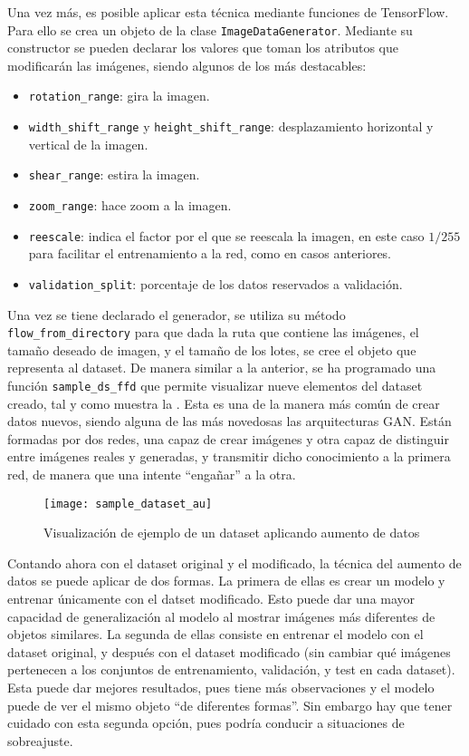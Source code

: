 			Una vez más, es posible aplicar esta técnica mediante funciones de TensorFlow. Para ello se crea un objeto de la clase \texttt{ImageDataGenerator}. Mediante su constructor se pueden declarar los valores que toman los atributos que modificarán las imágenes, siendo algunos de los más destacables: 
			
			\begin{itemize}
				\item \texttt{rotation\_range}: gira la imagen. 
				\item \texttt{width\_shift\_range} y \texttt{height\_shift\_range}: desplazamiento horizontal y vertical de la imagen. 
				\item \texttt{shear\_range}: estira la imagen. 
				\item \texttt{zoom\_range}: hace zoom a la imagen. 
				\item \texttt{reescale}: indica el factor por el que se reescala la imagen, en este caso $1/255$ para facilitar el entrenamiento a la red, como en casos anteriores. 
				\item \texttt{validation\_split}: porcentaje de los datos reservados a validación. 
			\end{itemize}
			
			Una vez se tiene declarado el generador, se utiliza su método \texttt{flow\_from\_directory} para que dada la ruta que contiene las imágenes, el tamaño deseado de imagen, y el tamaño de los lotes, se cree el objeto que representa al dataset. De manera similar a la anterior, se ha programado una función \texttt{sample\_ds\_ffd} que permite visualizar nueve elementos del dataset creado, tal y como muestra la . Esta es una de la manera más común de crear datos nuevos, siendo alguna de las más novedosas las arquitecturas GAN. Están formadas por dos redes, una capaz de crear imágenes y otra capaz de distinguir entre imágenes reales y generadas, y transmitir dicho conocimiento a la primera red, de manera que una intente ``engañar'' a la otra\cite{gan}. \\
			
			\begin{figure}
				\centering
				\texttt{[image: sample\_dataset\_au]}
				\caption{Visualización de ejemplo de un dataset aplicando aumento de datos}
				\label{fig:sample_dataset_au}
			\end{figure}
			
			Contando ahora con el dataset original y el modificado, la técnica del aumento de datos se puede aplicar de dos formas. La primera de ellas es crear un modelo y entrenar únicamente con el datset modificado. Esto puede dar una mayor capacidad de generalización al modelo al mostrar imágenes más diferentes de objetos similares. La segunda de ellas consiste en entrenar el modelo con el dataset original, y después con el dataset modificado (sin cambiar qué imágenes pertenecen a los conjuntos de entrenamiento, validación, y test en cada dataset). Esta puede dar mejores resultados, pues tiene más observaciones y el modelo puede de ver el mismo objeto ``de diferentes formas''. Sin embargo hay que tener cuidado con esta segunda opción, pues podría conducir a situaciones de sobreajuste. 
			
